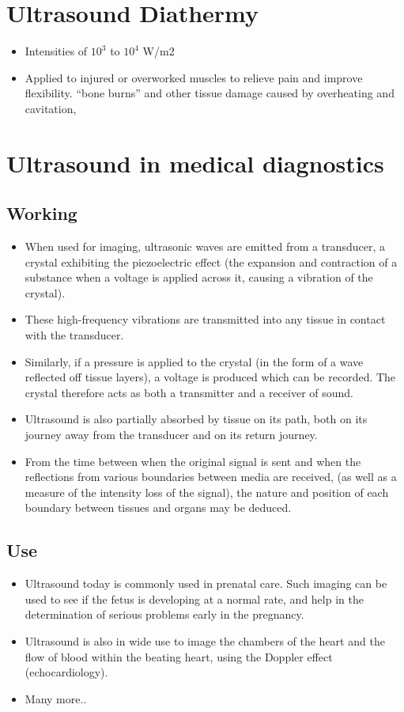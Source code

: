 \documentclass[12pt]{book}
\begin{document}
\section*{Ultrasound Diathermy}
\begin{itemize}
\item Intensities of $10^3$ to $10^4$ W/m2
\item  Applied to injured or overworked muscles
 to relieve pain and improve flexibility.
 “bone burns” and other tissue damage caused by overheating and cavitation,

\end{itemize}

\section*{Ultrasound in medical diagnostics }
\subsection*{Working}
\begin{itemize}
\item When used for imaging, ultrasonic waves are emitted from a transducer, a crystal exhibiting the piezoelectric effect (the expansion and contraction of a substance when a voltage is applied across it, causing a vibration of the crystal).
\item These high-frequency vibrations are transmitted into any tissue in contact with the transducer.
\item  Similarly, if a pressure is applied to the crystal (in the form of a wave reflected off tissue layers), a voltage is produced which can be recorded. The crystal therefore acts as both a transmitter and a receiver of sound.
\item Ultrasound is also partially absorbed by tissue on its path, both on its journey away from the transducer and on its return journey.
\item From the time between when the original signal is sent and when the reflections from various boundaries between media are received, (as well as a measure of the intensity loss of the signal), the nature and position of each boundary between tissues and organs may be deduced.
\end{itemize}
\subsection*{Use}
\begin{itemize}
\item Ultrasound today is commonly used in prenatal care. Such imaging can be used to see if the fetus is developing at a normal rate, and help in the determination of serious problems early in the pregnancy.
\item Ultrasound is also in wide use to image the chambers of the heart and the flow of blood within the beating heart, using the Doppler effect (echocardiology).
\item Many more..
\end{itemize}
\end{document}
